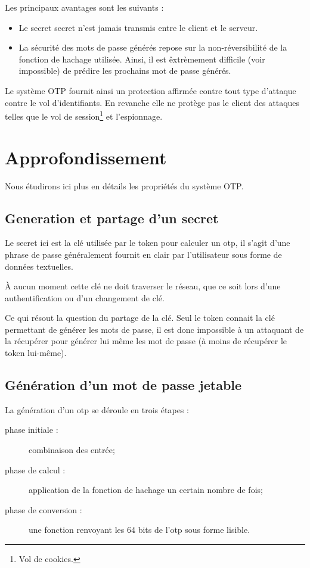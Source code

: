 \documentclass{../res/univ-projet}
\begin{document}
  Les principaux avantages sont les suivants :

  \begin{itemize}
    \item Le secret secret n'est jamais transmis entre le client et le serveur.
    \item La sécurité des mots de passe générés repose sur la non-réversibilité 
    de la fonction de hachage utilisée. Ainsi, il est \^extrèmement difficile (voir 
    impossible) de prédire les prochains mot de passe générés.\\
  \end{itemize}

  Le système OTP fournit ainsi un protection affirmée contre tout type 
  d'attaque contre le vol d'identifiants.
  En revanche elle ne protège pas le client des attaques telles 
  que le vol de session\footnote{Vol de cookies.} et l'espionnage.

\section{Approfondissement}
  Nous étudirons ici plus en détails  les propriétés du système OTP.

  \subsection{Generation et partage d'un secret}
    Le secret ici est la clé utilisée par le token pour calculer un otp, il 
s'agit d'une phrase de passe généralement fournit en clair par l'utilisateur 
sous forme de données textuelles. 

    À aucun moment cette clé ne doit traverser le réseau, que ce soit lors 
d'une authentification ou d'un changement de clé.

    Ce qui résout la question du partage de la clé. Seul le token connait la 
clé permettant de générer les mots de passe, il est donc impossible à un attaquant 
de la récupérer pour générer lui même les mot de passe (à moins de récupérer 
le token lui-même).

  \subsection{Génération d'un mot de passe jetable}

    La génération d'un otp se déroule en trois étapes :
    \begin{description}
      \item [phase initiale :] combinaison des entrée;
      \item [phase de calcul :] application de la fonction de hachage un 
      certain nombre de fois;
      \item [phase de conversion :] une fonction renvoyant les 64 bits de l'otp 
      sous forme lisible.\\
    \end{description}
\end{document}
